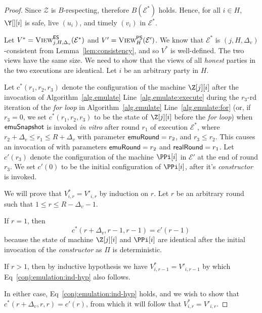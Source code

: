 \begin{proof}
  Since $\mathcal{Z}$ is $B$-respecting, therefore $B(\mathcal{E}^*)$ holds.
  Hence, for all $i \in H$, $\Y[][i]$ is safe, live $(u_i)$, and timely $(v_i)$
  in $\mathcal{E}^*$.

  \myparagraph[Claim 1: $\LCView_{j,H,\Delta_v}(\mathcal{E}^*) = \PEView_H(\mathcal{E}')$]
  Let $V^* = \textsc{View}^{\textsf{ES}}_{j,H,\Delta_v}(\mathcal{E}^*)$ and
  $V' = \textsc{View}^{\textsf{PS}}_H(\mathcal{E}')$.
  We know that $\mathcal{E}^*$ is $(j, H, \Delta_v)$-consistent
  from Lemma~\ref{lem:consistency}, and so $V^*$
  is well-defined.
  The two views have the same size.
  We need to show
  that the views of all \emph{honest} parties in the two executions are identical.
  Let $i$ be an arbitrary party in $H$.

  Let $c^*(r_1, r_2, r_3)$ denote the configuration
  of the machine $\Z[j][i]$ after the invocation of
  Algorithm~\ref{alg.emulate} Line~\ref{alg.emulate:execute}
  during the $r_3$-rd iteration of the \emph{for loop} in
  Algorithm~\ref{alg.emulate} Line~\ref{alg.emulate:for}
  (or, if $r_3 = 0$, we set $c^*(r_1, r_2, r_3)$ to be the state of
  $\Z[j][i]$ before the \emph{for loop})
  when $\textsf{emuSnapshot}$ is
  invoked \emph{in vitro} after round $r_1$ of execution $\mathcal{E}^*$,
  where $r_2 + \Delta_v \leq r_1 \leq R + \Delta_v$ with parameter
  $\textsf{emuRound} = r_2$, and $r_3 \leq r_2$.
  This causes an invocation of \emulate with parameters
  $\textsf{emuRound} = r_2$ and $\textsf{realRound} = r_1$.
  Let $c'(r_3)$ denote the configuration of the machine $\PPi[i]$
  in $\mathcal{E}'$ at the end of round $r_3$.
  We set $c'(0)$ to be the initial configuration of $\PPi[i]$,
  after it's \emph{constructor} is invoked.

  We will prove that $V^*_{i,r} = V'_{i,r}$ by induction on $r$.
  Let $r$ be an arbitrary round such that $1 \leq r \leq R - \Delta_v - 1$.

  If $r = 1$, then
  \begin{equation}\label{conj:emulation:ind-hyp}
    c^*(r + \Delta_v, r - 1, r - 1) = c'(r - 1)\,
  \end{equation}
  because the state of machine $\Z[j][i]$ and $\PPi[i]$ are identical
  after the initial invocation of the \emph{constructor} as $\Pi$
  is deterministic.

  If $r > 1$, then by inductive hypothesis we have $V^*_{i,r - 1} = V'_{i,r - 1}$
  by which Eq~\ref{conj:emulation:ind-hyp} also follows.

  In either case, Eq~\ref{conj:emulation:ind-hyp} holds, and we
  wish to show that $c^*(r + \Delta_v, r, r) = c'(r)$,
  from which it will follow that $V^*_{i,r} = V'_{i,r}$.


\end{proof}
